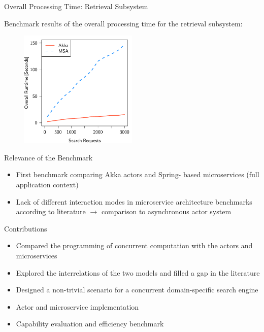 \documentclass{beamer}
\begin{document}

\begin{frame}{Overall Processing Time: Retrieval Subsystem}

Benchmark results of the overall processing time for the retrieval subsystem:

\begin{center}
  \begin{figure} 
    \includegraphics[width=0.5\textwidth]{graphics/eval-search-rtt-overall.pdf} 
  \end{figure}
\end{center}

\end{frame}


\begin{frame}{Relevance of the Benchmark}

\begin{itemize}
  \item First benchmark comparing Akka actors and Spring- based microservices (full application context)
  \item Lack of different interaction modes in microservice architecture benchmarks according to literature $\rightarrow$ comparison to asynchronous actor system
\end{itemize}

\end{frame}


\begin{frame}{Contributions}

\begin{itemize}
  \item Compared the programming of concurrent computation with the actors and microservices
  \item Explored the interrelations of the two models and filled a gap in the literature
  \item Designed a non-trivial scenario for a concurrent domain-specific search engine
  \item Actor and microservice implementation
  \item Capability evaluation and efficiency benchmark
\end{itemize}

\end{frame}
\end{document}
